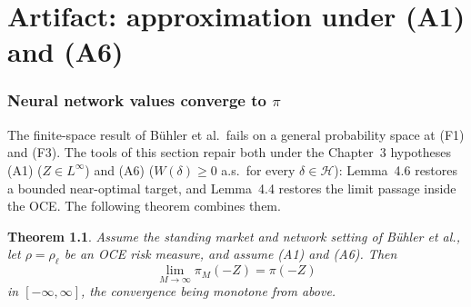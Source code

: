 \documentclass[11pt,a4paper]{report}
\numberwithin{equation}{chapter}
\theoremstyle{plain}
\newtheorem{theorem}[proposition]{Theorem}
\theoremstyle{definition}
\newcommand{\HH}{\mathcal{H}}
\begin{document}
\setcounter{chapter}{3}

\chapter{Artifact: approximation under (A1) and (A6)}

\subsection*{Neural network values converge to $\pi$}

The finite-space result of B\"uhler et al.\ fails on a general
probability space at (F1) and (F3). The tools of this section repair
both under the Chapter~3 hypotheses (A1) ($Z\in L^\infty$) and (A6)
($W(\delta)\ge0$ a.s.\ for every $\delta\in\HH$): Lemma~4.6 restores a
bounded near-optimal target, and Lemma~4.4 restores the limit passage
inside the OCE. The following theorem combines them.

\begin{theorem}\label{thm:approximation}
  Assume the standing market and network setting of B\"uhler et al., let
  $\rho=\rho_\ell$ be an OCE risk measure, and assume (A1) and (A6). Then
  \[
    \lim_{M\to\infty}\pi_M(-Z)=\pi(-Z)
  \]
  in $[-\infty,\infty]$, the convergence being monotone from above.
\end{theorem}
\end{document}
